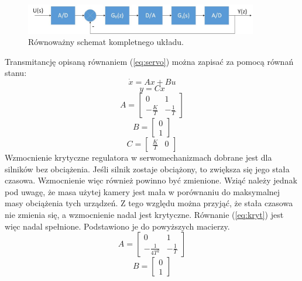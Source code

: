 \begin{figure}[h]
	\centering
	\includegraphics[width=4in]{uklad_digital.jpg}
	\caption{Równoważny schemat kompletnego układu.}
	\label{fig:uklad_digital}
\end{figure}

Transmitancję opisaną równaniem (\ref{eq:servo}) można zapisać za pomocą równań stanu:
\begin{equation}
\dot{x}=Ax+Bu
\end{equation}
\begin{equation}
y=Cx
\end{equation}
\begin{equation}
A=
	\begin{bmatrix}
	0 & 1 \\
	-\frac{K}{T} & -\frac{1}{T}
	\end{bmatrix}
\end{equation}
\begin{equation}
B=
	\begin{bmatrix}
	0 \\
	1
	\end{bmatrix}
\end{equation}
\begin{equation}
C=
	\begin{bmatrix}
	\frac{K}{T} & 0
	\end{bmatrix}
\end{equation}
Wzmocnienie krytyczne regulatora w serwomechanizmach dobrane jest dla silników bez obciążenia. 
Jeśli silnik zostaje obciążony, to zwiększa się jego stała czasowa. 
Wzmocnienie więc również powinno być zmienione. 
Wziąć należy jednak pod uwagę, że masa użytej kamery jest mała w porównaniu do maksymalnej masy obciążenia tych urządzeń. 
Z tego względu można przyjąć, że stała czasowa nie zmienia się, a wzmocnienie nadal jest krytyczne. 
Równanie (\ref{eq:kryt}) jest więc nadal spełnione. 
Podstawiono je do powyższych macierzy.
\begin{equation}
A=
	\begin{bmatrix}
	0 & 1 \\
	-\frac{1}{4T^2} & -\frac{1}{T}
	\end{bmatrix}
\end{equation}
\begin{equation}
B=
	\begin{bmatrix}
	0 \\
	1
	\end{bmatrix}
\end{equation}
